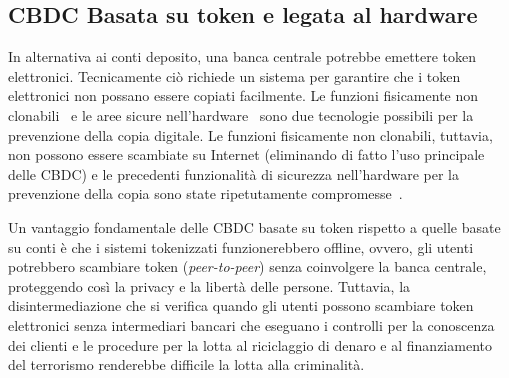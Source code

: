 \documentclass{article}
\begin{document}


\subsection{CBDC Basata su token e legata al hardware}
\label{cbdc-basata-su-token-e-legata-al-hardware}


In alternativa ai conti deposito, una banca centrale potrebbe emettere
token elettronici. Tecnicamente ciò richiede un sistema per garantire che
i token elettronici non possano essere copiati facilmente. Le funzioni
fisicamente non clonabili~\cite[vedi][]{Katzenbeisser} e le aree
sicure nell'hardware~\cite[vedi][]{Alves,Pinto} sono due tecnologie
possibili per la prevenzione della copia digitale. Le funzioni
fisicamente non clonabili, tuttavia, non possono essere scambiate su
Internet (eliminando di fatto l'uso principale delle CBDC) e le precedenti
funzionalità di sicurezza nell'hardware per la prevenzione della copia
sono state ripetutamente compromesse~\cite[si veda, ad esempio,][]{Wojtczuk,Johnston,Lapid}.

Un vantaggio fondamentale delle CBDC basate su token rispetto a quelle
basate su conti è che i sistemi tokenizzati funzionerebbero offline,
ovvero, gli utenti potrebbero scambiare token (\textit{peer-to-peer})
senza coinvolgere la banca centrale, proteggendo così la privacy e la
libertà delle persone. Tuttavia, la disintermediazione che si verifica
quando gli utenti possono scambiare token elettronici senza
intermediari bancari che eseguano i controlli per la conoscenza dei
clienti e le procedure per la lotta al riciclaggio di denaro e al
finanziamento del terrorismo renderebbe difficile la lotta alla
criminalità.

\end{document}

